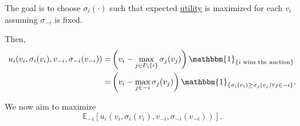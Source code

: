 The goal is to choose \(\sigma_{i}(\cdot)\) such that expected \hyperref[def:reward]{utility} is maximized for each \(v_{i}\) assuming \(\sigma_{-i}\) is fixed.

Then,
\[
	\begin{split}
		u_{i}(v_{i}, \sigma_{i}(v_{i}), v_{-i}, \sigma_{-i}(v_{-i}))
		=&\left(v_{i} - \max_{j\in I\setminus\{i\}}\sigma_{j}(v_{j})\right)\mathbbm{1}_{\{\text{\(i\) wins the auction}\}}\\
		=&\left(v_{i} - \max_{j\in -i}\sigma_{j}(v_{j})\right)\mathbbm{1}_{\{ \sigma_{i}(v_{i})\geq \sigma_{j}(v_{j}) \forall j\in -i \}}.
	\end{split}
\]

We now aim to maximize
\[
	\mathbb{E}_{-i}\left[u_{i}(v_{i}, \sigma_{i}(v_{i}), v_{-i}, \sigma_{-i}(v_{-i})) \right] .
\]

